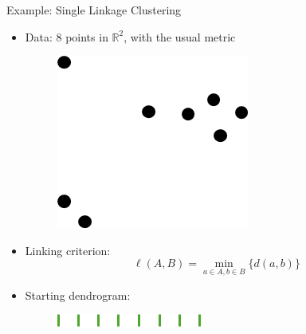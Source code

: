 \documentclass{beamer}
\begin{document}
  \begin{frame}{Example: Single Linkage Clustering}
    \begin{itemize}
      \item Data: 8 points in $\mathbb{R}^2$, with the usual metric
      \vspace*{.5cm}
      \begin{figure}
        \begin{center}
          \includegraphics[width=.35\textwidth]{cluster0.png}
        \end{center}
      \end{figure}
      \vspace*{.5cm}
      \item Linking criterion: $$\ell(A, B) = \min_{a\in A, b\in B}\{d(a,b)\}$$
      \item Starting dendrogram:
      \begin{figure}
        \begin{center}
          \includegraphics[width=.4\textwidth]{eightdend.png}
        \end{center}
      \end{figure}
    \end{itemize}
  \end{frame}
  
\end{document}
